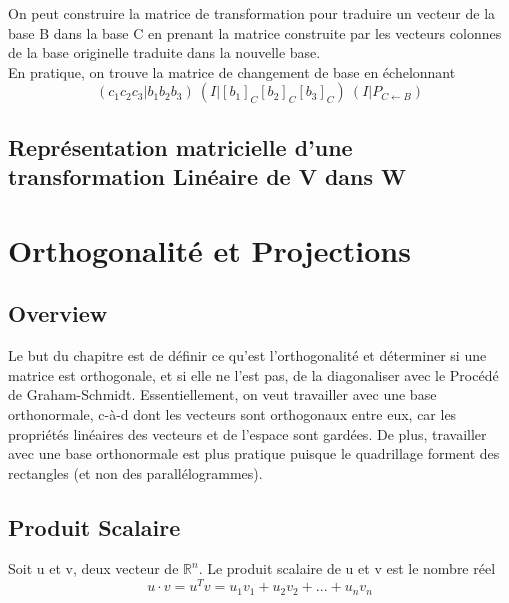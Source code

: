 \documentclass{article}
\begin{document}
\begin{remark}
    On peut construire la matrice de transformation pour traduire un
    vecteur de la base B dans la base C en prenant la matrice construite
    par les vecteurs colonnes de la base originelle traduite dans la
    nouvelle base.\\
    En pratique, on trouve la matrice de changement de base en échelonnant
    $$ (c_1 c_2 c_3 | b_1 b_2 b_3) ~ (I | [b_1]_C [b_2]_C [b_3]_C)
    ~ (I | P_{C \leftarrow B})$$
\end{remark}

\begin{remark}

\end{remark}

\subsection{Représentation matricielle d'une transformation Linéaire de V
dans W}

\pagebreak

\section{Orthogonalité et Projections}

\subsection{Overview}

Le but du chapitre est de définir ce qu'est l'orthogonalité et déterminer
si une matrice est orthogonale, et si elle ne l'est pas, de la diagonaliser
avec le Procédé de Graham-Schmidt. Essentiellement, on veut travailler
avec une base orthonormale, c-à-d dont les vecteurs sont orthogonaux
entre eux, car les propriétés linéaires des vecteurs et de l'espace sont
gardées. De plus, travailler avec une base orthonormale est plus pratique
puisque le quadrillage forment des rectangles (et non des parallélogrammes).

\subsection{Produit Scalaire}

\begin{definition}
    Soit u et v, deux vecteur de $\mathbb{R}^n$. Le produit scalaire de u
    et v est le nombre réel $$ u \cdot v = u^T v = u_1 v_1 + u_2 v_2 +
    ... + u_n v_n$$
\end{definition}
\end{document}
